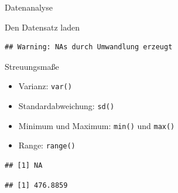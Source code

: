 \documentclass[ignorenonframetext,]{beamer}
\newenvironment{Shaded}{}{}
\newcommand{\KeywordTok}[1]{\textcolor[rgb]{0.00,0.44,0.13}{\textbf{{#1}}}}
\newcommand{\DataTypeTok}[1]{\textcolor[rgb]{0.56,0.13,0.00}{{#1}}}
\newcommand{\StringTok}[1]{\textcolor[rgb]{0.25,0.44,0.63}{{#1}}}
\newcommand{\NormalTok}[1]{{#1}}
\providecommand{\tightlist}{%
\setlength{\itemsep}{0pt}\setlength{\parskip}{0pt}}
\begin{document}
\begin{frame}[fragile]{Datenanalyse}

\begin{block}{Den Datensatz laden}

\begin{verbatim}
## Warning: NAs durch Umwandlung erzeugt
\end{verbatim}

\begin{Shaded}
\end{Shaded}

\end{block}

\begin{block}{Streuungsmaße}

\begin{itemize}
\tightlist
\item
  Varianz: \texttt{var()}
\item
  Standardabweichung: \texttt{sd()}
\item
  Minimum und Maximum: \texttt{min()} und \texttt{max()}
\item
  Range: \texttt{range()}
\end{itemize}

\begin{Shaded}
\end{Shaded}

\begin{verbatim}
## [1] NA
\end{verbatim}

\begin{Shaded}
\end{Shaded}

\begin{verbatim}
## [1] 476.8859
\end{verbatim}


\end{block}
\end{frame}
\end{document}
